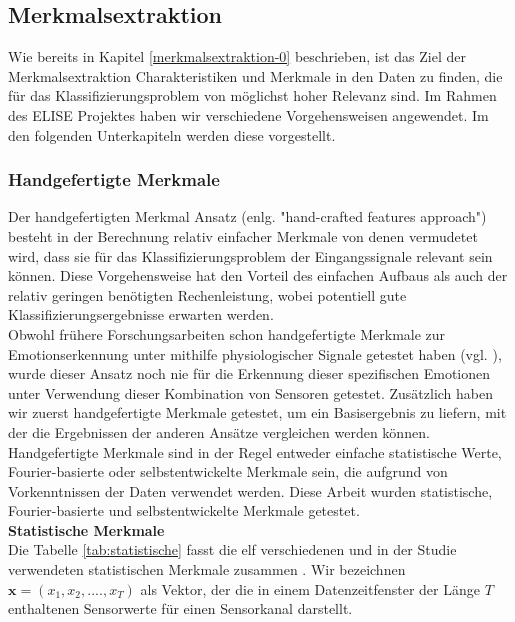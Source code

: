 \subsection{Merkmalsextraktion} \label{merkmalsextraftion-1}

Wie bereits in Kapitel \ref{merkmalsextraktion-0} beschrieben, ist das Ziel der Merkmalsextraktion Charakteristiken und Merkmale in den Daten zu finden, die für das
Klassifizierungsproblem von möglichst hoher Relevanz sind. Im Rahmen des ELISE Projektes haben wir verschiedene Vorgehensweisen angewendet. Im den folgenden Unterkapiteln werden diese vorgestellt. \\


\subsubsection{Handgefertigte Merkmale} \label{hc-features-1}
Der handgefertigten Merkmal Ansatz (enlg. "hand-crafted features approach") besteht in der Berechnung relativ einfacher Merkmale von denen vermudetet wird, dass sie für das Klassifizierungsproblem der Eingangssignale relevant sein können. Diese Vorgehensweise hat den Vorteil des einfachen Aufbaus als auch der relativ geringen benötigten Rechenleistung, wobei potentiell gute Klassifizierungsergebnisse erwarten werden. \\


Obwohl frühere Forschungsarbeiten schon handgefertigte Merkmale zur Emotionserkennung unter mithilfe physiologischer Signale getestet haben (vgl. \cite{martinez_ieee_2013}), wurde dieser Ansatz noch nie für die Erkennung dieser spezifischen Emotionen unter Verwendung dieser Kombination von Sensoren getestet.
Zusätzlich haben wir zuerst handgefertigte Merkmale getestet, um ein Basisergebnis zu liefern, mit der die Ergebnissen der anderen Ansätze vergleichen werden können.
Handgefertigte Merkmale sind in der Regel entweder einfache statistische Werte, Fourier-basierte oder selbstentwickelte Merkmale sein, die aufgrund von Vorkenntnissen der Daten verwendet werden. 
Diese Arbeit wurden statistische, Fourier-basierte und selbstentwickelte Merkmale getestet. \\

\textbf{Statistische Merkmale \\}
Die Tabelle \ref{tab:statistische} fasst die elf verschiedenen und in der Studie verwendeten statistischen Merkmale zusammen \cite{bscpiet}. Wir bezeichnen $\mathbf{x} = (x_1, x_2, ...., x_T) $ als Vektor, der die in einem Datenzeitfenster der Länge $T$ enthaltenen Sensorwerte für einen Sensorkanal darstellt. 



